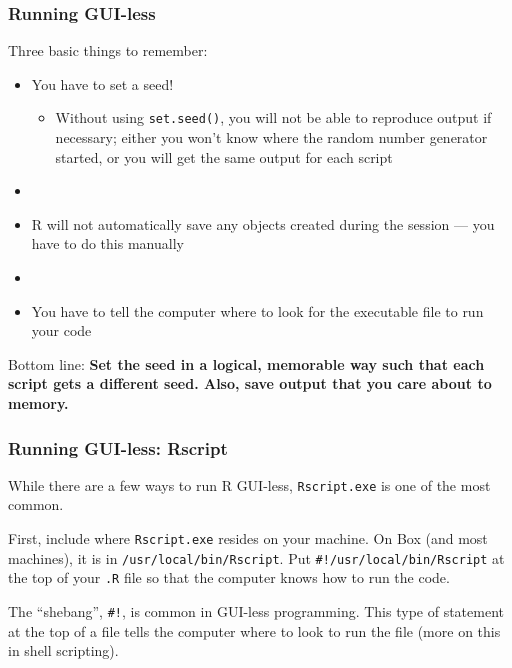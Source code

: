 \documentclass[12pt, 
hyperref={colorlinks=true, linkcolor=blue, urlcolor=cyan}]{beamer}
\newcommand{\myframe}[1]{\begin{frame} \frametitle{#1}}
\begin{document}
\myframe{Running GUI-less}
Three basic things to remember:
\begin{itemize}
\item You have to set a seed! 
\begin{itemize}
\item Without using \texttt{set.seed()}, you will not be able to reproduce output if necessary; either you won't know where the random number generator started, or you will get the same output for each script
\end{itemize}
\item[]
\item R will not automatically save any objects created during the session --- you have to do this manually
\item[]
\item You have to tell the computer where to look for the executable file to run your code
\end{itemize}
Bottom line: \textbf{Set the seed in a logical, memorable way such that each script gets a different seed. Also, save output that you care about to memory.}
\end{frame}

\begin{frame}[fragile]
\frametitle{Running GUI-less: Rscript}
While there are a few ways to run R GUI-less, \texttt{Rscript.exe} is one of the most common.

First, include where \texttt{Rscript.exe} resides on your machine. On Box (and most machines), it is in \texttt{/usr/local/bin/Rscript}. Put \texttt{\#!/usr/local/bin/Rscript} at the top of your \texttt{.R} file so that the computer knows how to run the code.

The ``shebang'', \texttt{\#!}, is common in GUI-less programming. This type of statement at the top of a file tells the computer where to look to run the file (more on this in shell scripting).

\end{frame}
\end{document}
